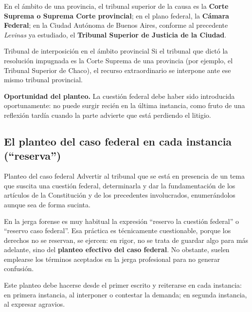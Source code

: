 \documentclass[12pt,oneside]{book}
\begin{document}
En el ámbito de una provincia, el tribunal superior de la causa es la \textbf{Corte Suprema o Suprema Corte provincial}; en el plano federal, la \textbf{Cámara Federal}; en la Ciudad Autónoma de Buenos Aires, conforme al precedente \emph{Levinas} ya estudiado, el \textbf{Tribunal Superior de Justicia de la Ciudad}.

\begin{example}{Tribunal de interposición en el ámbito provincial}
Si el tribunal que dictó la resolución impugnada es la Corte Suprema de una provincia (por ejemplo, el Tribunal Superior de Chaco), el recurso extraordinario se interpone ante ese mismo tribunal provincial.
\end{example}

\textbf{Oportunidad del planteo.} La cuestión federal debe haber sido introducida oportunamente: no puede surgir recién en la última instancia, como fruto de una reflexión tardía cuando la parte advierte que está perdiendo el litigio.

\subsection{El planteo del caso federal en cada instancia (``reserva'')}

\begin{definition}{Planteo del caso federal}
Advertir al tribunal que se está en presencia de un tema que suscita una cuestión federal, determinarla y dar la fundamentación de los artículos de la Constitución y de los precedentes involucrados, enumerándolos aunque sea de forma sucinta.
\end{definition}

\begin{note}
En la jerga forense es muy habitual la expresión ``reservo la cuestión federal'' o ``reservo caso federal''. Esa práctica es técnicamente cuestionable, porque los derechos no se reservan, se ejercen: en rigor, no se trata de guardar algo para más adelante, sino del \textbf{planteo efectivo del caso federal}. No obstante, suelen emplearse los términos aceptados en la jerga profesional para no generar confusión.
\end{note}

\begin{important}
Este planteo debe hacerse desde el primer escrito y reiterarse en cada instancia: en primera instancia, al interponer o contestar la demanda; en segunda instancia, al expresar agravios.
\end{important}
\end{document}

